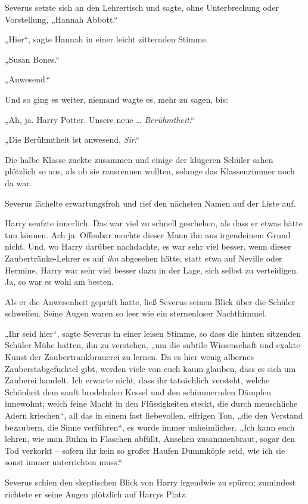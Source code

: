 {Severus setzte sich an den Lehrertisch und sagte, ohne Unterbrechung oder Vorstellung, „Hannah Abbott.“

„Hier“, sagte Hannah in einer leicht zitternden Stimme.

„Susan Bones.“

„Anwesend.“

Und so ging es weiter, niemand wagte es, mehr zu sagen, bis:

„Ah, ja. Harry Potter. Unsere neue … \emph{Berühmtheit}.“

„Die Berühmtheit ist anwesend, \emph{Sir}.“

Die halbe Klasse zuckte zusammen und einige der klügeren Schüler sahen plötzlich so aus, als ob sie rausrennen wollten, solange das Klassenzimmer noch da war.

Severus lächelte erwartungsfroh und rief den nächsten Namen auf der Liste auf.

Harry seufzte innerlich. Das war viel zu schnell geschehen, als dass er etwas hätte tun können. Ach ja. Offenbar mochte dieser Mann ihn aus irgendeinem Grund nicht. Und, wo Harry darüber nachdachte, es war sehr viel besser, wenn dieser Zaubertränke-Lehrer es auf \emph{ihn} abgesehen hätte, statt etwa auf Neville oder Hermine. Harry war sehr viel besser dazu in der Lage, sich selbst zu verteidigen. Ja, so war es wohl am besten.

Als er die Anwesenheit geprüft hatte, ließ Severus seinen Blick über die Schüler schweifen. Seine Augen waren so leer wie ein sternenloser Nachthimmel.

„Ihr seid hier“, sagte Severus in einer leisen Stimme, so dass die hinten sitzenden Schüler Mühe hatten, ihn zu verstehen, „um die subtile Wissenschaft und exakte Kunst der Zaubertrankbrauerei zu lernen. Da es hier wenig albernes Zauberstabgefuchtel gibt, werden viele von euch kaum glauben, dass es sich um Zauberei handelt. Ich erwarte nicht, dass ihr tatsächlich versteht, welche Schönheit dem sanft brodelnden Kessel und den schimmernden Dämpfen innewohnt; welch feine Macht in den Flüssigkeiten steckt, die durch menschliche Adern kriechen“, all das in einem fast liebevollen, eifrigen Ton, „die den Verstand bezaubern, die Sinne verführen“, es wurde immer unheimlicher. „Ich kann euch lehren, wie man Ruhm in Flaschen abfüllt, Ansehen zusammenbraut, sogar den Tod verkorkt -- sofern ihr kein so großer Haufen Dummköpfe seid, wie ich sie sonst immer unterrichten muss.“

Severus schien den skeptischen Blick von Harry irgendwie zu spüren; zumindest richtete er seine Augen plötzlich auf Harrys Platz.

}
